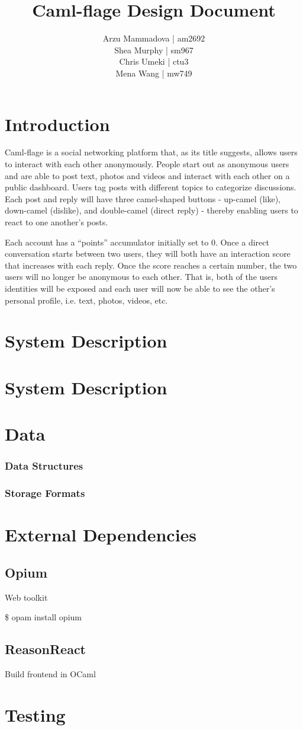 \documentclass[11pt]{article}
\title{Caml-flage Design Document}
\author{Arzu Mammadova | am2692 \\ Shea Murphy | sm967 \\ Chris Umeki | ctu3 \\ Mena Wang | mw749}
\begin{document}
\maketitle

\section{Introduction}
Caml-flage is a social networking platform that, as its title suggests, allows users to interact with each other anonymously. People start out as anonymous users and are able to post text, photos and videos and interact with each other on a public dashboard. Users tag posts with different topics to categorize discussions. Each post and reply will have three camel-shaped buttons - up-camel (like), down-camel (dislike), and double-camel (direct reply) - thereby enabling users to react to one another’s posts. 

Each account has a “points” accumulator initially set to 0. Once a direct conversation starts between two users, they will both have an interaction score that increases with each reply. Once the score reaches a certain number, the two users will no longer be anonymous to each other. That is, both of the users identities will be exposed and each user will now be able to see the other’s personal profile, i.e. text, photos, videos, etc. 


\section{System Description}


\section{System Description}

\section{Data}

\subsubsection{Data Structures}

\subsubsection{Storage Formats}

\section{External Dependencies}

\subsection{Opium}
Web toolkit 

\$ opam install opium


\subsection{ReasonReact}
Build frontend in OCaml

\section{Testing}
\end{document}
